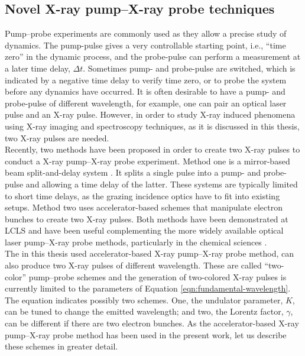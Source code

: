 \subsection{Novel X-ray pump–X-ray probe techniques}\label{sec:novel-pump--probe-tech}
Pump--probe experiments are commonly used as they allow a precise study of dynamics. The pump-pulse gives a very controllable starting point, i.e., ``time zero'' in the dynamic process, and the probe-pulse can perform a measurement at a later time delay, $\Delta t$. Sometimes pump- and probe-pulse are switched, which is indicated by a negative time delay to verify time zero, or to probe the system before any dynamics have occurred.
It is often desirable to have a pump- and probe-pulse of different wavelength, for example, one can pair an optical laser pulse and an X-ray pulse.
However, in order to study X-ray induced phenomena using X-ray imaging and spectroscopy techniques, as it is discussed in this thesis, two X-ray pulses are needed.\\[1\baselineskip]
%
Recently, two methods have been proposed in order to create two X-ray pulses to conduct a X-ray pump--X-ray probe experiment. Method one is a mirror-based beam split-and-delay system \citep{Castagna-2013-JPCS,Murphy-2012-SPIE}. It splits a single pulse into a pump- and probe-pulse and allowing a time delay of the latter. These systems are typically limited to short time delays, as the grazing incidence optics have to fit into existing setups. Method two uses accelerator-based schemes \citep{Lutman-2013-PRL,Marinelli-2015-NatComm} that manipulate electron bunches to create two X-ray pulses.
Both methods have been demonstrated at LCLS and have been useful complementing the more widely available optical laser pump--X-ray probe methods, particularly in the chemical sciences \citep{Picon-2016-NatComm,Ferguson-2016-SciAdv,Liekhus-Schmaltz-2015-NatComm}.\\[1\baselineskip]
%
The in this thesis used accelerator-based X-ray pump--X-ray probe method, can also produce two X-ray pulses of different wavelength. These are called ``two-color'' pump--probe schemes and the generation of two-colored X-ray pulses is currently limited to the parameters of Equation \eqref{eqn:fundamental-wavelength}. The equation indicates possibly two schemes. One, the undulator parameter, $K$, can be tuned to change the emitted wavelength; and two, the Lorentz factor, $\gamma$, can be different if there are two electron bunches. As the accelerator-based X-ray pump--X-ray probe method has been used in the present work, let us describe these schemes in greater detail.
%
%
%
